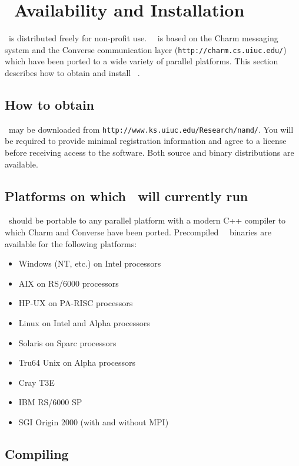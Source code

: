 \section{\NAMD\ Availability and Installation}
\label{section:avail}

\NAMD\ is distributed freely for non-profit use.
\NAMD\ \NAMDVER\ is based on the Charm messaging system and the
Converse communication layer ({\tt http://charm.cs.uiuc.edu/})
which have been ported to a wide variety of parallel platforms.
This section describes how to obtain and install \NAMD\ \NAMDVER.

\subsection{How to obtain \NAMD}

\NAMD\ may be downloaded from {\tt http://www.ks.uiuc.edu/Research/namd/}.
You will be required to provide minimal registration information and
agree to a license before receiving access to the software.
Both source and binary distributions are available.

\subsection{Platforms on which \NAMD\ will currently run}
\NAMD\ should be portable to any parallel platform with a
modern C++ compiler to which Charm and Converse have been ported.
Precompiled \NAMD\ \NAMDVER\ binaries are available for the following platforms:  
\begin{itemize}
\item Windows (NT, etc.) on Intel processors 
\item AIX on RS/6000 processors 
\item HP-UX on PA-RISC processors 
\item Linux on Intel and Alpha processors 
\item Solaris on Sparc processors 
\item Tru64 Unix on Alpha processors 
\item Cray T3E 
\item IBM RS/6000 SP 
\item SGI Origin 2000 (with and without MPI) 
\end{itemize}

\subsection{Compiling \NAMD}

